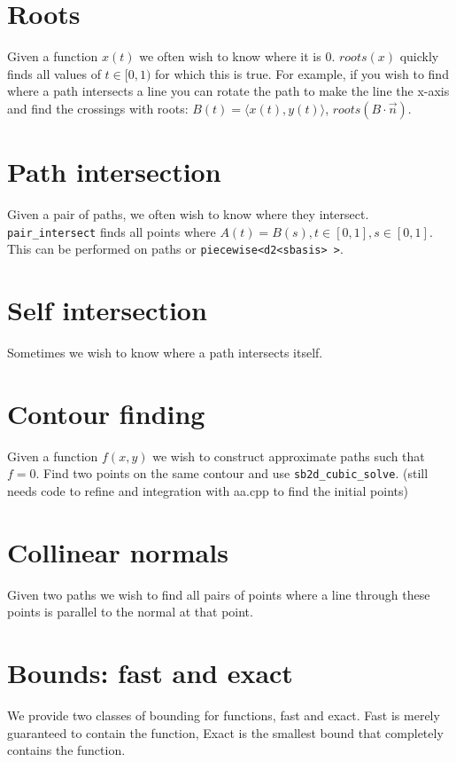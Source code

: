 \documentclass[openany]{book}
\begin{document}
\section{Roots}

Given a function $x(t)$ we often wish to know where it is 0.
$roots(x)$ quickly finds all values of $t \in [0,1)$ for which this is
true.  For example, if you wish to find where a path intersects a line you can rotate the path to make the line the x-axis and find the crossings with roots: $B(t) = \langle x(t), y(t)\rangle$, $roots(B \cdot \vec n)$.

\section{Path intersection}

Given a pair of paths, we often wish to know where they intersect.  \verb|pair_intersect| finds all points where $A(t) = B(s), t \in [0,1], s \in [0,1]$.  This can be performed on paths or \verb|piecewise<d2<sbasis> >|.

\section{Self intersection}

Sometimes we wish to know where a path intersects itself.

\section{Contour finding}

Given a function $f(x, y)$ we wish to construct approximate paths such that $f = 0$.  Find two points on the same contour and use \verb|sb2d_cubic_solve|.  (still needs code to refine and integration with aa.cpp to find the initial points)

\section{Collinear normals}

Given two paths we wish to find all pairs of points where a line through these points is parallel to the normal at that point.

\section{Bounds: fast and exact}

We provide two classes of bounding for functions, fast and exact.
Fast is merely guaranteed to contain the function, Exact is the
smallest bound that completely contains the function.
\end{document}
